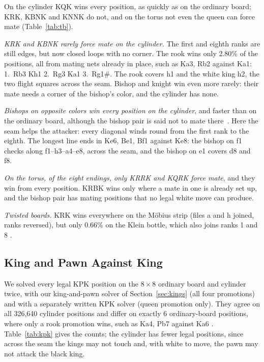 On the cylinder KQK wins every position, as quickly as on the ordinary board; KRK, KBNK and KNNK do not, and
on the torus not even the queen can force mate (Table~\ref{tab:tb}).

\emph{KRK and KBNK rarely force mate on the cylinder.} The first and eighth ranks are still edges, but now
closed loops with no corner. The rook wins only 2.80\% of the positions, all from mating nets already
in place, such as Ka3, Rb2 against Ka1: 1.~Rb3 Kh1 2.~Rg3 Ka1 3.~Rg1\#. The rook covers h1 and the
white king h2, the two flight squares across the seam. Bishop and knight win even more rarely: their mate
needs a corner of the bishop's color, and the cylinder has none.

\emph{Bishops on opposite colors win every position on the cylinder}, and faster than on the ordinary board,
although the bishop pair is said not to mate there~\cite{HGMCylinder}.
Here the seam helps the attacker: every diagonal winds round from the first rank to the eighth. The longest
line ends in Ke6, Be1, Bf1 against Ke8: the bishop on f1 checks along f1--h3--a4--e8, across the seam, and
the bishop on e1 covers d8 and f8.

\emph{On the torus, of the eight endings, only KRRK and KQRK force mate}, and they win from every position. KRBK wins only where
a mate in one is already set up, and the bishop pair has mating positions that no legal white move can
produce.

\emph{Twisted boards.} KRK wins everywhere on the M\"obius strip (files a and h joined, ranks reversed), but
only $0.66\%$ on the Klein bottle, which also joins ranks 1 and 8 .

\subsection{King and Pawn Against King}\label{sec:kpk}

We solved every legal KPK position on the $8\times8$ ordinary board and cylinder twice, with our
king-and-pawn solver of Section~\ref{sec:kings} (all four promotions) and with a separately written KPK
solver (queen promotion only). They agree on all 326,640 cylinder positions and differ on exactly 6
ordinary-board positions, where only a rook promotion wins, such as Ka4, Pb7 against
Ka6 . Table~\ref{tab:kpk} gives the counts; the cylinder has fewer legal positions, since across the seam
the kings may not touch and, with white to move, the pawn may not attack the black king.

